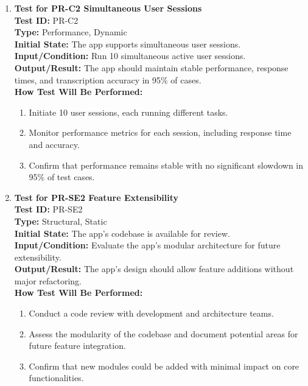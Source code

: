 \documentclass[12pt, titlepage]{article}
\begin{document}
\begin{enumerate}
    \item \textbf{Test for PR-C2 Simultaneous User Sessions} \\
      \newline
      \textbf{Test ID:} PR-C2 \\
      \textbf{Type:} Performance, Dynamic \\
      \textbf{Initial State:} The app supports simultaneous user sessions. \\
      \textbf{Input/Condition:} Run 10 simultaneous active user sessions. \\
      \textbf{Output/Result:} The app should maintain stable performance, response times, and transcription accuracy in 
      95\% of cases. \\
      \textbf{How Test Will Be Performed:}
      \begin{enumerate}
          \item Initiate 10 user sessions, each running different tasks.
          \item Monitor performance metrics for each session, including response time and accuracy.
          \item Confirm that performance remains stable with no significant slowdown in 95\% of test cases.
      \end{enumerate}

    \item \textbf{Test for PR-SE2 Feature Extensibility} \\
      \newline
      \textbf{Test ID:} PR-SE2 \\
      \textbf{Type:} Structural, Static \\
      \textbf{Initial State:} The app’s codebase is available for review. \\
      \textbf{Input/Condition:} Evaluate the app’s modular architecture for future extensibility. \\
      \textbf{Output/Result:} The app’s design should allow feature additions without major refactoring. \\
      \textbf{How Test Will Be Performed:}
      \begin{enumerate}
          \item Conduct a code review with development and architecture teams.
          \item Assess the modularity of the codebase and document potential areas for future feature integration.
          \item Confirm that new modules could be added with minimal impact on core functionalities.
      \end{enumerate}


\end{enumerate}
\end{document}
